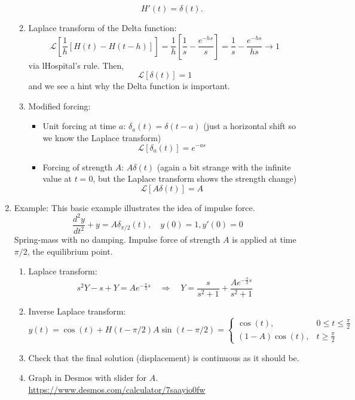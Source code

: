 \documentclass{article}
\begin{document}
\begin{enumerate}
\begin{enumerate}
\begin{itemize}
\[
H'(t) = \delta(t).
\]
\end{itemize}
\item Laplace transform of the Delta function:
\[
\mathcal{L}\left[ \frac{1}{h}\left[H(t)-H(t-h)\right] \right] = \frac{1}{h} \left[ \frac{1}{s} - \frac{e^{-hs}}{s} \right] =
\frac{1}{s} - \frac{e^{-hs}}{hs}  \rightarrow 1
\]
via lHospital's rule. Then,
\[
\mathcal{L} \left[ \delta(t) \right] = 1
\]
and we see a hint why the Delta function is important.
\item Modified forcing:
\begin{itemize}
\item Unit forcing at time $a$: $\delta_a(t) = \delta(t-a)$ (just a horizontal shift so we know the Laplace transform)
\[
\mathcal{L}[\delta_a(t)] = e^{-as}
\]
\item Forcing of strength $A$: $A\delta(t)$ (again a bit strange with the infinite value at $t=0$, but the Laplace transform shows the strength change)
\[
\mathcal{L}[A\delta(t)] = A
\]
\end{itemize}
\end{enumerate}

\item Example: This basic example illustrates the idea of impulse force.
\[
\frac{d^2 y}{dt^2} + y = A \delta_{\pi/2}(t), \quad y(0)=1, y'(0)=0
\]
Spring-mass with no damping. Impulse force of strength $A$ is applied at time $\pi/2$, the equilibrium point.
\begin{enumerate}
\item Laplace transform:
\[
s^2 Y - s + Y = Ae^{-\frac{\pi}{2} s} \quad \Rightarrow \quad Y = \frac{s}{s^2+1} + \frac{Ae^{-\frac{\pi}{2} s}}{s^2+1}
\]
\item Inverse Laplace transform:
\[
y(t) = \cos(t) + H(t-\pi/2)A\sin(t-\pi/2) =
\begin{cases}
\cos(t), & 0 \leq t \leq \frac{\pi}{2} \\
(1-A)\cos(t), & t \geq \frac{\pi}{2}
\end{cases}
\]
\item Check that the final solution (displacement) is continuous as it should be.
\item Graph in Desmos with slider for $A$. \url{https://www.desmos.com/calculator/7saayio0fw}
\end{enumerate}


\end{enumerate}
\end{document}
